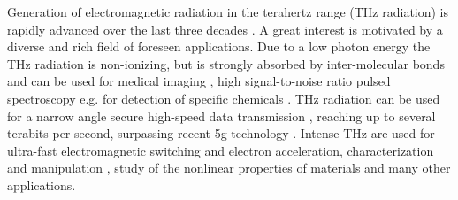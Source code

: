 \documentclass[aps,prl,twocolumn,superscriptaddress]{revtex4-1}
\begin{document}
Generation of electromagnetic radiation in the terahertz range (THz radiation) is rapidly advanced over the last three decades \cite{Dhillon2017}. A great interest is motivated by a diverse and rich field of foreseen applications. Due to a low photon energy the THz radiation is non-ionizing, but is strongly absorbed by inter-molecular bonds and can be used for medical imaging \cite{Qiushuo2017}, high signal-to-noise ratio pulsed spectroscopy e.g. for detection of specific chemicals \cite{Giles2008, Liu2018}. THz radiation can be used for a narrow angle secure high-speed data transmission \cite{Jianjun2018}, reaching up to several terabits-per-second, surpassing recent 5g technology \cite{Huang2011}. Intense THz are used for ultra-fast electromagnetic switching \cite{Balos2020, Kampfrath2011} and electron acceleration, characterization \cite{Downer2018} and manipulation \cite{Dongfang2018, Dongfang2020}, study of the nonlinear properties of materials \cite{Liu2012} and many other applications.

\end{document}
